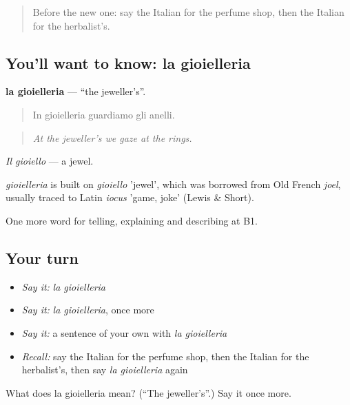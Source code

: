 \label{lesson:IT-C453-gioielleria}



\begin{quote}
Before the new one: say the Italian for the perfume shop, then the Italian for the herbalist's.
\end{quote}

\subsection*{You'll want to know: la gioielleria}
\textbf{la gioielleria} — \textquotedblleft{}the jeweller's\textquotedblright{}.

\begin{quote}
In gioielleria guardiamo gli anelli.
\end{quote}

\begin{quote}
\emph{At the jeweller's we gaze at the rings.}
\end{quote}

\emph{Il gioiello} — a jewel.

\begin{cousinweb}
\emph{gioielleria} is built on \emph{gioiello} 'jewel', which was borrowed from Old French \emph{joel}, usually traced to Latin \emph{iocus} 'game, joke' (Lewis \& Short).
\end{cousinweb}

\begin{grammarlens}[title={What you've built}]
One more word for telling, explaining and describing at B1.
\end{grammarlens}

\subsection*{Your turn}
\begin{itemize}
\raggedright
  \item \emph{Say it:} \emph{la gioielleria}
  \item \emph{Say it:} \emph{la gioielleria}, once more
  \item \emph{Say it:} a sentence of your own with \emph{la gioielleria}
  \item \emph{Recall:} say the Italian for the perfume shop, then the Italian for the herbalist's, then say \emph{la gioielleria} again
\end{itemize}

\begin{tcolorbox}[breakable,colback=teal!4,colframe=teal!35!black,title={Before you move on}]
What does la gioielleria mean? (\textquotedblleft{}The jeweller's\textquotedblright{}.) Say it once more.
\end{tcolorbox}
